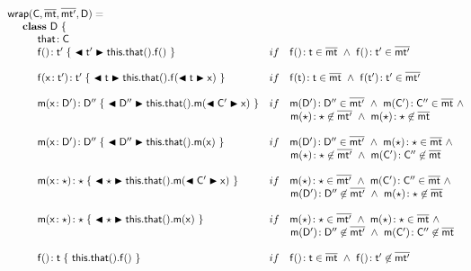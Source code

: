 \documentclass[acmlarge, anonymous, authordraft]{acmart}
\begin{document}
\vspace{4mm}
\[\begin{array}{@{}ll@{}l@{}r@{~}c@{~}r}
    \wrap\C\bmt\bmtp\D = \\
\SP \class ~\D ~ \{\\
\SPP \Fdef\that\C \\
\SPP \Mdefz\f{\tp}{~\bscast\tp{\Get{\Get\this\that}\f}~}
&    if\,\,\,\,\,\, \Mtype\f{}\t\in\bmt ~\wedge~ \Mtype\f{}\tp \in \bmtp \\
\\
\SPP \Mdef\f\x\tp\tp {~\bscast\t{\Set{\Get\this\that}\f{\bscast\t\x}}~}
&    if\,\,\,\,\,\, \Mtype\f\t\t \in \bmt ~\wedge~ \Mtype\f\tp\tp \in \bmtp \\
\\
\SPP \Mdef\m\x\Dp\Dpp {~\bscast\Dpp{{\Call{\Get\this\that} \m {\bscast{\Cp}\x} }}~}
&     if\,\,\,\,\,\, \Mtype\m\Dp\Dpp\in\bmtp ~\wedge~ \Mtype\m\Cp\Cpp\in\bmt ~\wedge~  \\
&     \multicolumn{5}{l}{\qquad \Mtype\m\any\any\not\in\bmtp ~\wedge~ \Mtype\m\any\any\not\in\bmt} \\
\\
\SPP \Mdef\m\x\Dp\Dpp{~\bscast\Dpp{\Call{\Get\this\that} \m {\x} }~}
&    if\,\,\,\,\,\, \Mtype\m\Dp\Dpp\in\bmtp ~\wedge~ \Mtype\m\any\any\in\bmt~\wedge~  \\
&     \multicolumn{5}{l}{\qquad \Mtype\m\any\any\not\in\bmtp ~\wedge~ \Mtype\m\Cp\Cpp\not\in\bmt} \\
\\
\SPP \Mdef\m\x\any\any{~\bscast\any{\Call{\Get\this\that} \m {\bscast{\Cp}\x} }~}
&    if\,\,\,\,\,\, \Mtype\m\any\any\in\bmtp ~\wedge~ \Mtype\m\Cp\Cpp\in\bmt ~\wedge~  \\
&     \multicolumn{5}{l}{\qquad \Mtype\m\Dp\Dpp\not\in\bmtp ~\wedge~ \Mtype\m\any\any\not\in\bmt} \\
\\
\SPP \Mdef\m\x\any\any{~\bscast\any{\Call{\Get\this\that} \m {\x} }~}
&    if\,\,\,\,\,\, \Mtype\m\any\any\in\bmtp ~\wedge~ \Mtype\m\any\any\in\bmt ~\wedge~  \\
&     \multicolumn{5}{l}{\qquad \Mtype\m\Dp\Dpp\not\in\bmtp ~\wedge~ \Mtype\m\Cp\Cpp\not\in\bmt} \\
\\
\SPP \Mdefz\f\t { ~\Get{\Get\this\that}\f~}
&    if\,\,\,\,\,\, \Mtype\f{}\t \in \bmt ~\wedge~ \Mtype\f{}\tp \not\in \bmtp \\

\end{array}\]
\end{document}
